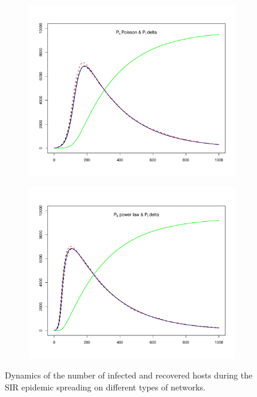 \begin{figure}[hbtp]
\begin{subfigure}[b]{0.45\textwidth}
    \end{subfigure}
    \newline
    \begin{subfigure}[b]{0.45\textwidth}
        \centering
        \includegraphics[width=\textwidth, trim=30 20 30 20, clip]{../img/sir_02.pdf}
    \end{subfigure}
    \hspace{0.08\textwidth}
    \begin{subfigure}[b]{0.45\textwidth}
        \centering
        \includegraphics[width=\textwidth, trim=30 20 30 20, clip]{../img/sir_12.pdf}
    \end{subfigure}
    \newline
    \caption{Dynamics of the number of infected and recovered hosts during the SIR epidemic spreading on different types of networks.}
\end{figure}

